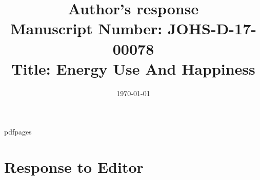 \marginsize{2cm}{2cm}{0cm}{1cm} %
\renewcommand\familydefault{\sfdefault}


 \renewcommand{\topfraction}{.9}	%
 \renewcommand{\bottomfraction}{.9}	%
 \renewcommand{\textfraction}{0.1}	%

 
\newenvironment{ig}[1]{
\begin{center}
 \texttt{[image: \#1]} 
\end{center}}

\usepackage{pdfpages}

\newlength\tindent
\setlength{\tindent}{\parindent}
\setlength{\parindent}{0pt}
\renewcommand{\indent}{\hspace*{\tindent}}

 
\date{{}\today}
\title{Author's response\\ {\large Manuscript Number: JOHS-D-17-00078 \\ Title:  Energy Use And Happiness }}

\author{}


\maketitle

\tableofcontents

\section{Response to Editor} 



